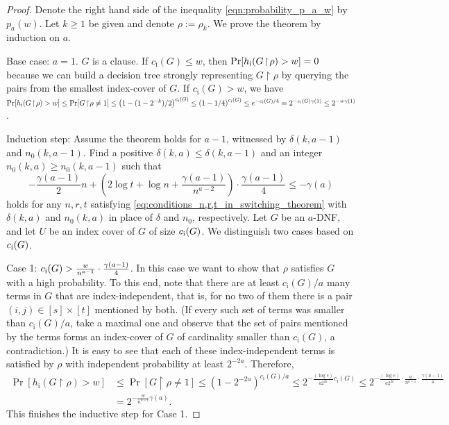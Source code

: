 \begin{proof}
Denote the right hand side of the inequality \eqref{eqn:probability_p_a_w} by $p_a(w)$. Let $k \geq 1$ be given and denote $\rho := \rho_k$. We prove the theorem by induction on $a$.

Base case: $a = 1$. $G$ is a clause. If $c_{\text{i}}(G) \leq w$, then $\Pr[h_{\textnormal{i}}(G \! \restriction \! \rho) > w] = 0$ because we can build a decision tree strongly representing $G \! \restriction \! \rho$ by querying the pairs from the smallest index-cover of $G$. If $c_{\text{i}}(G) > w$, we have $\Pr[h_{\textnormal{i}}(G \! \restriction \! \rho) > w] \leq \Pr[G \! \restriction \! \rho \neq 1] \leq \left( 1 - (1-2^{-k})/2 \right)^{c_{\text{i}}(G)} \leq \left( 1 - 1/4 \right)^{c_{\text{i}}(G)}  \leq e^{- c_{\text{i}}(G)/4} = 2^{- c_{\text{i}}(G) \gamma(1)} \leq 2^{-w \gamma(1)}$.

Induction step: Assume the theorem holds for $a-1$, witnessed by $\delta(k,a-1)$ and $n_0(k,a-1)$. Find a positive $\delta(k,a) \leq \delta(k,a-1)$ and an integer $n_0(k,a) \geq n_0(k,a-1)$ such that
\begin{equation}
\label{eq:condition_on_delta_and_n0}
 - \frac{\gamma(a-1)}{2}n + \left(2 \log t + \log n + \frac{\gamma(a-1)}{n^{a-2}} \right) \cdot \frac{\gamma(a-1)}{4} \leq - \gamma(a)
\end{equation}
holds for any $n,r,t$ satisfying \ref{eq:conditions_n,r,t_in_switching_theorem} with $\delta(k,a)$ and $n_0(k,a)$ in place of $\delta$ and $n_0$, respectively. Let $G$ be an $a$-DNF, and let $U$ be an index cover of $G$ of size $c_{\textnormal{i}}(G)$. We distinguish two cases based on $c_{\textnormal{i}}(G)$.

Case 1: $c_{\textnormal{i}}(G) > \frac{w}{n^{a-1}} \cdot \frac{\gamma(a-1)}{4}$. In this case we want to show that $\rho$ satisfies $G$ with a high probability. To this end, note that there are at least $c_{\text{i}}(G)/a$ many terms in $G$ that are index-independent, that is, for no two of them there is a pair $(i,j) \in [s] \times [t]$ mentioned by both. (If every such set of terms was smaller than $c_{\text{i}}(G)/a$, take a maximal one and observe that the set of pairs mentioned by the terms forms an index-cover of $G$ of cardinality smaller than $c_{\text{i}}(G)$, a contradiction.) It is easy to see that each of these index-independent terms is satisfied by $\rho$ with independent probability at least $2^{-2a}$. Therefore,
\begin{align*}
  \Pr[h_{\text{i}}(G \! \restriction \! \rho) > w] 
& \leq \Pr[G \! \restriction \! \rho \neq 1] \leq \left( 1 - 2^{-2a} \right)^{c_{\text{i}}(G)/a} 
  \leq 2^{-\frac{(\log e)}{a 2^{2a}} c_{\text{i}}(G)} 
  \leq 2^{-\frac{(\log e)}{a 2^{2a}} \cdot \frac{w}{n^{a-1}} \cdot \frac{\gamma(a-1)}{4}} \\
& = 2^{ - \frac{w}{n^{a-1}}\gamma(a)}.
\end{align*}
This finishes the inductive step for Case 1. 


\end{proof}
